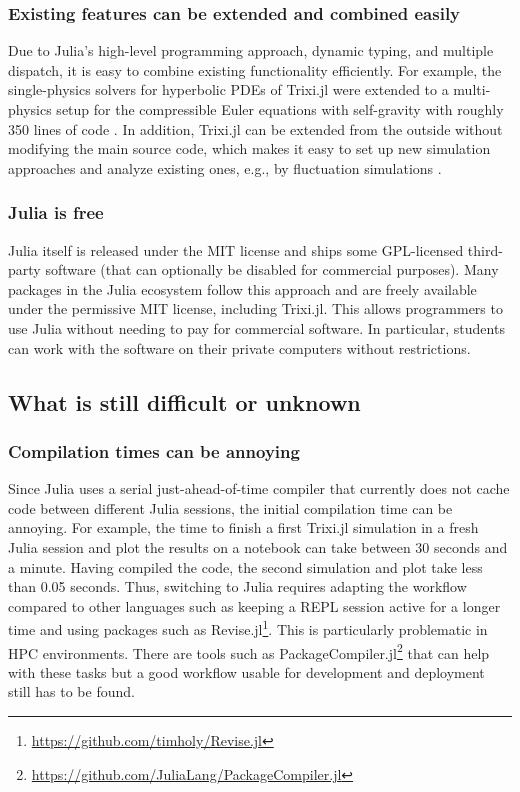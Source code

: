 \documentclass[hidelinks]{juliacon} %
\makeatletter
\newcommand{\eg}[0]{{e.g.\@}\xspace}
\newcommand{\trixi}{Trixi.jl\xspace}
\makeatother
\begin{document}
\subsubsection{Existing features can be extended and combined easily}

Due to Julia's high-level programming approach, dynamic typing, and multiple
dispatch, it is easy to combine existing functionality efficiently. For example,
the single-physics solvers for hyperbolic PDEs of \trixi were extended to
a multi-physics setup for the compressible Euler equations with self-gravity
with roughly 350 lines of code \cite{schlottkelakemper2021purely}.
In addition, \trixi can be extended from the outside without modifying the main
source code, which makes it easy to set up new simulation approaches and analyze
existing ones, \eg, by fluctuation simulations \cite{ranocha2021preventing}.

\subsubsection{Julia is free}

Julia itself is released under the MIT license and ships some GPL-licensed
third-party software (that can optionally be disabled for commercial purposes).
Many packages in the Julia ecosystem follow this approach and are freely available
under the permissive MIT license, including \trixi. This allows programmers to use Julia
without needing to pay for commercial software. In particular, students can
work with the software on their private computers without restrictions.


\subsection{What is still difficult or unknown}

\subsubsection{Compilation times can be annoying}

Since Julia uses a serial just-ahead-of-time compiler that currently does not cache
code between different Julia sessions, the initial compilation time can be
annoying. For example, the time to finish a first \trixi simulation in a fresh Julia
session and plot the results on a notebook can take between 30 seconds and a
minute. Having compiled the code, the second simulation and plot take less than
0.05 seconds. Thus, switching to Julia requires adapting the workflow compared
to other languages such as keeping a REPL session active for a longer time and
using packages such as Revise.jl\footnote{\url{https://github.com/timholy/Revise.jl}}.
This is particularly problematic in HPC environments. There are tools such as
PackageCompiler.jl\footnote{\url{https://github.com/JuliaLang/PackageCompiler.jl}}
that can help with these tasks but a good workflow usable for development and
deployment still has to be found.
\end{document}
